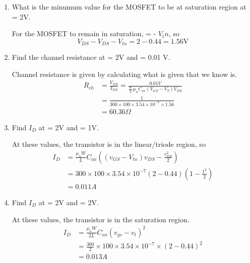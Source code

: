 \begin{enumerate}
\begin{enumerate}
        \item What is the minumum \vds value for the MOSFET to be at saturation region at \vgs = 2V. 
        \begin{Ans}
            For the MOSFET to remain in saturation, \vds = \vgs - $V_tn$, so 
            \[V_{DS} - V_{DS} - V_{tn} = 2 - 0.44 = 1.56 \mathrm{V}\]
        \end{Ans}

        \item Find the channel resistance at \vgs = 2V and \vds = 0.01 V.
        \begin{Ans}
            Channel resistance is given by calculating what \ids is given that we know \vds is. 
            \begin{align*}
                R_{ch} &= \frac{V_{DS}}{I_{DS}} = \frac{0.01 V}{\frac{W}{L} \mu_n C_{ox} (V_{GS} - V_T) V_{DS}} \\
                &= \frac{1}{300 \times 100 \times 3.54 \times 10^{-7} \times 1.56} \\
                &= 60.36 \Omega
            \end{align*}
        \end{Ans}

        \item Find $I_D$ at \vgs = 2V and \vds = 1V.
        \begin{Ans}
            At these values, the transistor is in the linear/triode region, so 
            \begin{align*}
                I_D &= \frac{\mu_n W}{L} C_{ox} ((v_{GS} - V_{tn}) v_{DS} - \frac{v_{DS}^2}{2}) \\ 
                &= 300 \times 100 \times 3.54 \times 10^{-7}(2 - 0.44) (1 - \frac{1^2}{2}) \\
                &= 0.011 A
            \end{align*}
        \end{Ans}        

        \item Find $I_D$ at \vgs = 2V and \vds = 2V.
        \begin{Ans}
            At these values, the transistor is in the saturation region.
            \begin{align*}
                I_D &= \frac{\mu_n W}{2 L} C_{ox} (v_{gs} - v_t)^2 \\
                &= \frac{300}{2} \times 100 \times 3.54 \times 10^{-7} \times (2-0.44)^2 \\
                &= 0.013 A
            \end{align*}
        \end{Ans}
    \end{enumerate}


\end{enumerate}
